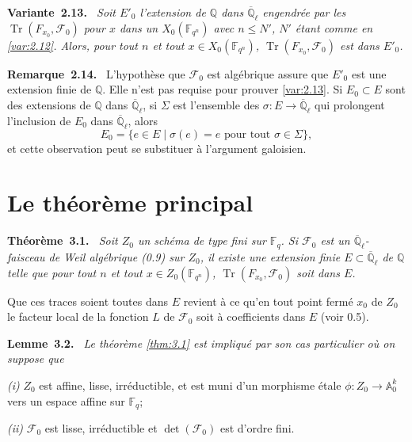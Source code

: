 \documentclass[11pt,a4paper]{article}
\makeatletter
\theoremstyle{plain}
\theoremstyle{definition}
\newenvironment{manualblock}[4]{%
  \par\medskip\noindent\textbf{#1~#2#3.}\def\@currentlabel{#2}\label{#4}\itshape\ }{\par\normalfont\medskip}
\newenvironment{manualremark}[4]{%
  \par\medskip\noindent\textbf{#1~#2#3.}\def\@currentlabel{#2}\label{#4}\ }{\par\medskip}
\DeclareMathOperator{\tr}{Tr}
\makeatother
\begin{document}
\begin{manualblock}{Variante}{2.13}{}{var:2.13}
Soit $E'_0$ l'extension de $\mathbb{Q}$ dans $\overline{\mathbb{Q}}_\ell$ engendr\'ee par les $\tr(F_{x_0}, \mathcal{F}_0)$ pour $x$ dans un $X_0(\mathbb{F}_{q^n})$ avec $n \leq N'$, $N'$ \'etant comme en \ref{var:2.12}. Alors, pour tout $n$ et tout $x \in X_0(\mathbb{F}_{q^n})$, $\tr(F_{x_0}, \mathcal{F}_0)$ est dans $E'_0$.
\end{manualblock}

\begin{manualremark}{Remarque}{2.14}{}{rem:2.14}
L'hypoth\`ese que $\mathcal{F}_0$ est alg\'ebrique assure que $E'_0$ est une extension finie de $\mathbb{Q}$. Elle n'est pas requise pour prouver \ref{var:2.13}. Si $E_0 \subset E$ sont des extensions de $\mathbb{Q}$ dans $\overline{\mathbb{Q}}_\ell$, si $\Sigma$ est l'ensemble des $\sigma: E \to \overline{\mathbb{Q}}_\ell$ qui prolongent l'inclusion de $E_0$ dans $\overline{\mathbb{Q}}_\ell$, alors
\[
E_0 = \{e \in E \mid \sigma(e) = e \text{ pour tout } \sigma \in \Sigma\},
\]
et cette observation peut se substituer \`a l'argument galoisien.
\end{manualremark}

\section{Le th\'eor\`eme principal}

\begin{manualblock}{Théorème}{3.1}{}{thm:3.1}
Soit $Z_0$ un sch\'ema de type fini sur $\mathbb{F}_q$. Si $\mathcal{F}_0$ est un $\overline{\mathbb{Q}}_\ell$-faisceau de Weil alg\'ebrique (0.9) sur $Z_0$, il existe une extension finie $E \subset \overline{\mathbb{Q}}_\ell$ de $\mathbb{Q}$ telle que pour tout $n$ et tout $x \in Z_0(\mathbb{F}_{q^n})$, $\tr(F_{x_0}, \mathcal{F}_0)$ soit dans $E$.
\end{manualblock}

Que ces traces soient toutes dans $E$ revient \`a ce qu'en tout point ferm\'e $x_0$ de $Z_0$ le facteur local de la fonction $L$ de $\mathcal{F}_0$ soit \`a coefficients dans $E$ (voir 0.5).

\begin{manualblock}{Lemme}{3.2}{}{lem:3.2}
Le th\'eor\`eme \ref{thm:3.1} est impliqu\'e par son cas particulier o\`u on suppose que

\emph{(i)} $Z_0$ est affine, lisse, irr\'eductible, et est muni d'un morphisme \'etale $\phi: Z_0 \to \mathbb{A}_0^{k}$ vers un espace affine sur $\mathbb{F}_q$;

\emph{(ii)} $\mathcal{F}_0$ est lisse, irr\'eductible et $\det(\mathcal{F}_0)$ est d'ordre fini.
\end{manualblock}
\end{document}
